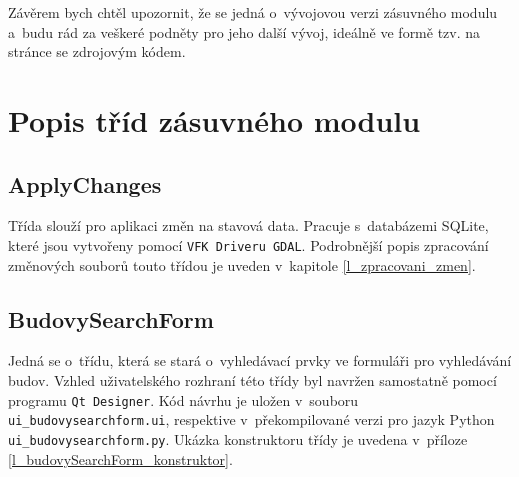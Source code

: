\documentclass[a4paper,12pt,oneside]{book}
\begin{document}
Závěrem bych chtěl upozornit, že se jedná o~vývojovou verzi zásuvného
modulu a~budu rád za veškeré podněty pro jeho další vývoj, ideálně ve formě
tzv.  na stránce se zdrojovým kódem.



\clearpage
\rhead{{\rightmark}}	%
\renewcommand{\refname}{Použitá literatura}



\clearpage
\listoffigures

\clearpage
\listoftables

\clearpage
\lstlistoflistings

\newpage
\appendix

\setcounter{page}{1}   	%


\clearpage
\chapter{Popis tříd zásuvného modulu}

\section{ApplyChanges}
Třída slouží pro aplikaci změn na stavová data. Pracuje s~databázemi SQLite,
které jsou vytvořeny pomocí \texttt{VFK Driveru GDAL}. Podrobnější popis 
zpracování změnových souborů touto třídou je uveden v~kapitole
\ref{l_zpracovani_zmen}.

\section{BudovySearchForm}
Jedná se o~třídu, která se stará o~vyhledávací prvky ve formuláři pro
vyhledávání budov. Vzhled
uživatelského rozhraní této třídy byl navržen samostatně pomocí
programu \texttt{Qt Designer}. Kód návrhu je uložen v~souboru
\texttt{ui\_budovysearchform.ui}, respektive v~překompilované verzi
pro jazyk Python \texttt{ui\_budovysearchform.py}. Ukázka konstruktoru
třídy je uvedena v~příloze \ref{l_budovySearchForm_konstruktor}.
\end{document}
